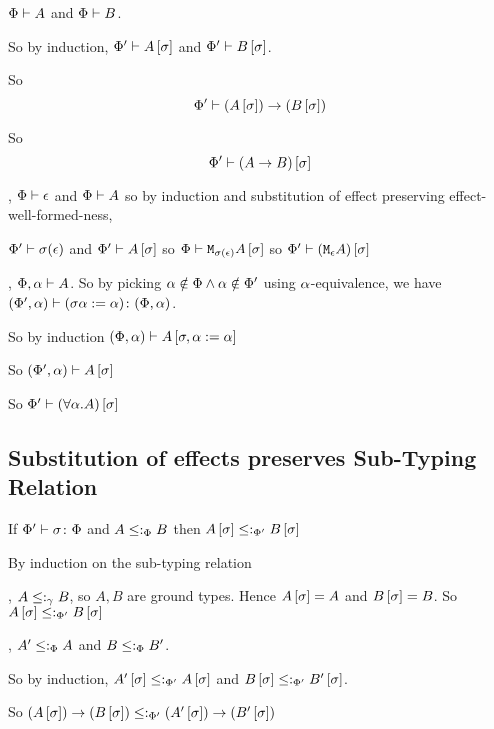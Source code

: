 {    

    \bi $\Phi\vdash A$ and $\Phi\vdash B$.

    So by induction, $\Phi'\vdash A\left[\sigma\right]$ and $\Phi'\vdash B\left[\sigma\right]$.

    So \begin{equation}
        \Phi'\vdash (A\left[\sigma\right])\rightarrow (B\left[\sigma\right])
    \end{equation}

    So \begin{equation}
        \Phi'\vdash (A\rightarrow B)\left[\sigma\right]
    \end{equation}

    


    \bi, $\Phi\vdash \epsilon$ and $\Phi\vdash A$ so by induction and substitution of effect preserving effect-well-formed-ness, 

    $\Phi'\vdash \sigma(\epsilon)$ and $\Phi'\vdash A\left[\sigma\right]$ so $\Phi\vdash \texttt{M}_{\sigma(\epsilon)}{A\left[\sigma\right]}$ so $\Phi'\vdash (\texttt{M}_{\epsilon}{A})\left[\sigma\right]$

    \bi, $\Phi,\alpha\vdash A$. So by picking $\alpha\notin\Phi\wedge\alpha\notin\Phi'$ using $\alpha$-equivalence, we have $(\Phi',\alpha) \vdash (\sigma\alpha:=\alpha) \colon (\Phi,\alpha)$.

    So by induction $(\Phi, \alpha)\vdash A\left[\sigma,\alpha:=\alpha\right]$

    So $(\Phi',\alpha)\vdash A\left[\sigma\right]$

    So $\Phi'\vdash (\forall \alpha. A)\left[\sigma\right]$

    \subsection{Substitution of effects preserves Sub-Typing Relation}

    If $\Phi' \vdash \sigma \colon \Phi$ and $A\leq:_\Phi B$ then $A\left[\sigma\right]\leq:_{\Phi'} B\left[\sigma\right]$

    \proof
    By induction on the sub-typing relation

    \bi, $A\leq:_\gamma B$, so $A, B$ are ground types.
    Hence $A\left[\sigma\right] = A$ and $B\left[\sigma\right] = B$.
    So $A\left[\sigma\right]\leq:_{\Phi'} B\left[\sigma\right]$

    \bi, $A'\leq:_\Phi A$ and $B\leq:_\Phi B'$.
    
    So by induction, $A'\left[\sigma\right]\leq:_{\Phi'} A\left[\sigma\right]$ and $B\left[\sigma\right]\leq:_{\Phi'} B'\left[\sigma\right]$.

    So $(A\left[\sigma\right])\rightarrow (B\left[\sigma\right])\leq:_{\Phi'} (A'\left[\sigma\right])\rightarrow (B'\left[\sigma\right])$

}
